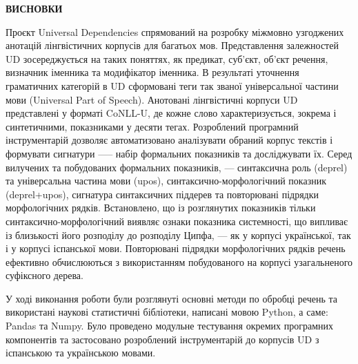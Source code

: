 {}

\pagestyle{empty}

\begin{center}
\textbf{\Large ВИСНОВКИ}
\end{center}


Проєкт Universal Dependencies спрямований на розробку міжмовно
узгоджених анотацій лінгвістичних корпусів для багатьох мов. Представлення
залежностей UD зосереджується на таких поняттях, як предикат, суб’єкт, об’єкт
речення, визначник іменника та модифікатор іменника. В результаті уточнення
граматичних категорій в UD сформовані теги так званої універсальної частини
мови (Universal Part of Speech).
Анотовані лінгвістичні корпуси UD представлені у форматі CoNLL-U, де
кожне слово характеризується, зокрема і синтетичними, показниками у десяти
тегах.
Розроблений програмний інструментарій дозволяє автоматизовано
аналізувати обраний корпус текстів і формувати сигнатури —-- набір формальних
показників та досліджувати їх.
Серед вилучених та побудованих формальних показників, --- синтаксична
роль (deprel) та універсальна частина мови (upos), синтаксично-морфологічний
показник (deprel+upos), сигнатура синтаксичних піддерев та повторювані підрядки
морфологічних рядків.
Встановлено, що із розглянутих показників тільки синтаксично-морфологічний
виявляє ознаки показника системності, що випливає із близькості
його розподілу до розподілу Ципфа, --- як у корпусі української, так і у корпусі
іспанської мови.
Повторювані підрядки морфологічних рядків речень ефективно
обчислюються з використанням побудованого на корпусі узагальненого суфіксного
дерева.

У ході виконання роботи були розглянуті основні методи по обробці речень та
використані наукові статистичні бібліотеки, написані мовою Python, а саме: Pandas
та Numpy. Було проведено модульне тестування окремих програмних компонентів
та застосовано розроблений інструментарій до корпусів UD з іспанською та
українською мовами.